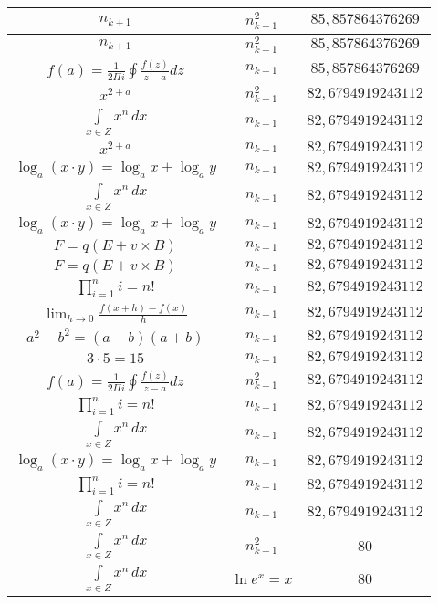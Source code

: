 \documentclass{article}
\begin{document}
\begin{flushleft}
\begin{longtable}{|c|c|c|}
$n_{k+1}$ & $n_{k+1}^2$ & $85,857864376269$ \\ \hline 
$n_{k+1}$ & $n_{k+1}^2$ & $85,857864376269$ \\ \hline 
$f\left(a\right)=\frac{1}{2\Pi i}\oint\frac{f\left(z\right)}{z-a}dz$ & $n_{k+1}$ & $85,857864376269$ \\ \hline 
$x^{2+a}$ & $n_{k+1}^2$ & $82,6794919243112$ \\ \hline 
$\int \limits_{x\in Z}\!x^{n}\,dx$ & $n_{k+1}$ & $82,6794919243112$ \\ \hline 
$x^{2+a}$ & $n_{k+1}$ & $82,6794919243112$ \\ \hline 
$\log_{a}(x\cdot y)=\log_{a}x+\log_{a}y$ & $n_{k+1}$ & $82,6794919243112$ \\ \hline 
$\int \limits_{x\in Z}\!x^{n}\,dx$ & $n_{k+1}$ & $82,6794919243112$ \\ \hline 
$\log_{a}(x\cdot y)=\log_{a}x+\log_{a}y$ & $n_{k+1}$ & $82,6794919243112$ \\ \hline 
$F=q\left(E+v\times B\right)$ & $n_{k+1}$ & $82,6794919243112$ \\ \hline 
$F=q\left(E+v\times B\right)$ & $n_{k+1}$ & $82,6794919243112$ \\ \hline 
$\prod_{i=1}^ni=n!$ & $n_{k+1}$ & $82,6794919243112$ \\ \hline 
$\lim_{h\to0}\frac{f(x+h)-f(x)}{h}$ & $n_{k+1}$ & $82,6794919243112$ \\ \hline 
$a^2-b^2=(a-b)(a+b)$ & $n_{k+1}$ & $82,6794919243112$ \\ \hline 
$3\cdot 5=15$ & $n_{k+1}$ & $82,6794919243112$ \\ \hline 
$f\left(a\right)=\frac{1}{2\Pi i}\oint\frac{f\left(z\right)}{z-a}dz$ & $n_{k+1}^2$ & $82,6794919243112$ \\ \hline 
$\prod_{i=1}^ni=n!$ & $n_{k+1}$ & $82,6794919243112$ \\ \hline 
$\int \limits_{x\in Z}\!x^{n}\,dx$ & $n_{k+1}$ & $82,6794919243112$ \\ \hline 
$\log_{a}(x\cdot y)=\log_{a}x+\log_{a}y$ & $n_{k+1}$ & $82,6794919243112$ \\ \hline 
$\prod_{i=1}^ni=n!$ & $n_{k+1}$ & $82,6794919243112$ \\ \hline 
$\int \limits_{x\in Z}\!x^{n}\,dx$ & $n_{k+1}$ & $82,6794919243112$ \\ \hline 
$\int \limits_{x\in Z}\!x^{n}\,dx$ & $n_{k+1}^2$ & $80$ \\ \hline 
$\int \limits_{x\in Z}\!x^{n}\,dx$ & $\ln e^x=x$ & $80$ \\ \hline 

\end{longtable}
\end{flushleft}
\end{document}
